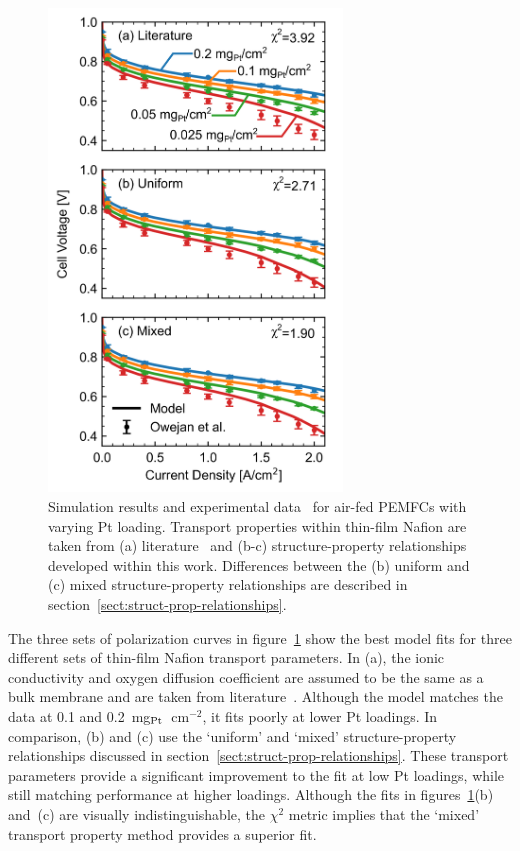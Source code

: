 \documentclass[final,3p,times,twocolumn]{elsarticle}    %
\begin{document}
\begin{figure}[!tb]
    \centering
    \includegraphics[width=3.07in]{figures/validation-air-vert-3_07in.png}
    \caption{Simulation results and experimental data~\cite{bib:owejan_2013} for air-fed PEMFCs with varying Pt loading. Transport properties within thin-film Nafion are taken from (a) literature~\cite{bib:yadav_2012, bib:sethuraman_2009} and (b-c) structure-property relationships developed within this work. Differences between the (b) uniform and (c) mixed structure-property relationships are described in section~\ref{sect:struct-prop-relationships}.}
    \label{fig:validation_air}
\end{figure}

The three sets of polarization curves in figure~\ref{fig:validation_air} show the best model fits for three different sets of thin-film Nafion transport parameters. In (a), the ionic conductivity and oxygen diffusion coefficient are assumed to be the same as a bulk membrane and are taken from literature~\cite{bib:yadav_2012, bib:sethuraman_2009}. Although the model matches the data at 0.1 and 0.2~mg$_{\rm Pt}$~cm$^{-2}$, it fits poorly at lower Pt loadings. In comparison, (b) and (c) use the `uniform' and `mixed' structure-property relationships discussed in section~\ref{sect:struct-prop-relationships}. These transport parameters provide a significant improvement to the fit at low Pt loadings, while still matching performance at higher loadings. Although the fits in figures~\ref{fig:validation_air}(b) and~(c) are visually indistinguishable, the $\chi^2$ metric implies that the `mixed' transport property method provides a superior fit.
\end{document}
